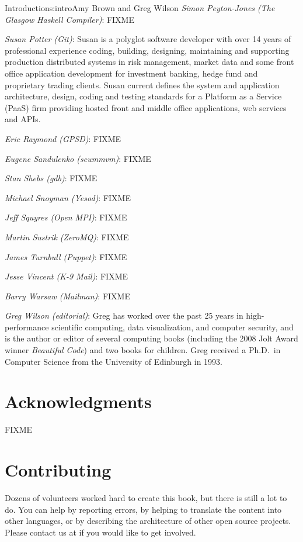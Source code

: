 \begin{aosachapter}{Introduction}{s:intro}{Amy Brown and Greg Wilson}
\emph{Simon Peyton-Jones (The Glasgow Haskell Compiler)}: FIXME

\emph{Susan Potter (Git)}: Susan is a polyglot software developer with
over 14 years of professional experience coding, building, designing,
maintaining and supporting production distributed systems in risk management,
market data and some front office application development for investment
banking, hedge fund and proprietary trading clients. Susan current defines the
system and application architecture, design, coding and testing standards for
a Platform as a Service (PaaS) firm providing hosted front and middle office
applications, web services and APIs.

\emph{Eric Raymond (GPSD)}: FIXME

\emph{Eugene Sandulenko (scummvm)}: FIXME

\emph{Stan Shebs (gdb)}: FIXME

\emph{Michael Snoyman (Yesod)}: FIXME

\emph{Jeff Squyres (Open MPI)}: FIXME

\emph{Martin Sustrik (ZeroMQ)}: FIXME

\emph{James Turnbull (Puppet)}: FIXME

\emph{Jesse Vincent (K-9 Mail)}: FIXME

\emph{Barry Warsaw (Mailman)}: FIXME

\emph{Greg Wilson (editorial)}: Greg has worked over the past 25 years
in high-performance scientific computing, data visualization, and
computer security, and is the author or editor of several computing
books (including the 2008 Jolt Award winner \emph{Beautiful Code}) and
two books for children.  Greg received a Ph.D.\ in Computer Science
from the University of Edinburgh in 1993.

\section*{Acknowledgments}

FIXME

\section*{Contributing}

Dozens of volunteers worked hard to create this book, but there is
still a lot to do.  You can help by reporting errors, by helping to
translate the content into other languages, or by describing the
architecture of other open source projects.  Please contact us at
 if you would like to get involved.

\end{aosachapter}
